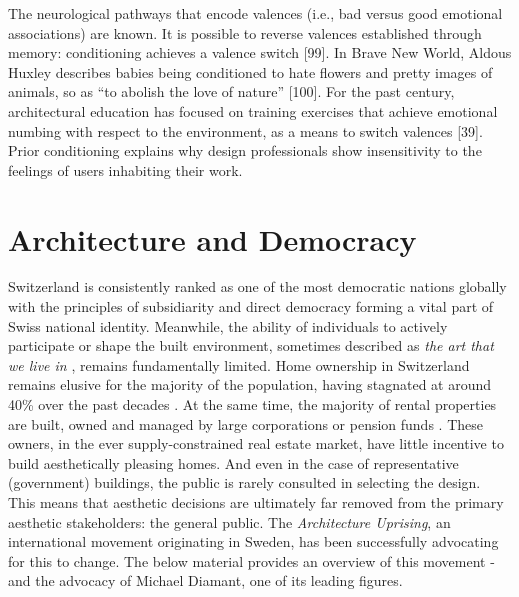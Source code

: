 \documentclass[a4paper]{article}
\begin{document}
The neurological pathways that encode valences (i.e., bad versus good emotional
associations) are known. It is possible to reverse valences established through memory:
conditioning achieves a valence switch [99]. In Brave New World, Aldous Huxley describes
babies being conditioned to hate flowers and pretty images of animals, so as “to abolish
the love of nature” [100]. For the past century, architectural education has focused on
training exercises that achieve emotional numbing with respect to the environment, as a
means to switch valences [39]. Prior conditioning explains why design professionals show
insensitivity to the feelings of users inhabiting their work.

\clearpage
\section{Architecture and Democracy}

\begin{mdframed}[linewidth=1pt, roundcorner=5pt, innerleftmargin=10pt, innerrightmargin=10pt, innertopmargin=10pt, innerbottommargin=10pt, linecolor=black, backgroundcolor=white, userdefinedwidth=\textwidth]
    Switzerland is consistently ranked as one of the most democratic nations globally \cite{noauthor_economist_2023} with the principles of subsidiarity and direct democracy forming a vital part of Swiss national identity. Meanwhile, the ability of individuals to actively participate or shape the built environment, sometimes described as \textit{the art that we live in} \cite{hughes_shock_1980}, remains fundamentally limited. Home ownership in Switzerland remains elusive for the majority of the population, having stagnated at around 40\% over the past decades \cite{noauthor_home_2022}. At the same time, the majority of rental properties are built, owned and managed by large corporations or pension funds \cite{noauthor_wem_nodate}. These owners, in the ever supply-constrained real estate market, have little incentive to build aesthetically pleasing homes. And even in the case of representative (government) buildings, the public is rarely consulted in selecting the design. This means that aesthetic decisions are ultimately far removed from the primary aesthetic stakeholders: the general public. The \textit{Architecture Uprising}, an international movement originating in Sweden, has been successfully advocating for this to change. The below material provides an overview of this movement - and the advocacy of Michael Diamant, one of its leading figures.
\end{mdframed}
\end{document}
